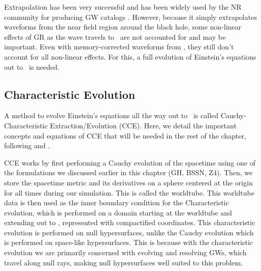 \begin{bibunit}[unsrtnat]
Extrapolation has been very successful and has been widely used by the NR
community for producing GW catalogs
\cite{Boyle:2019kee,Healy:2022wdn,Ferguson:2023vta,Hamilton:2023qkv}. However,
because it simply extrapolates waveforms from the near field region around the
black hole, some non-linear effects of GR as the wave travels to \scri~are not
accounted for and may be important. Even with memory-corrected waveforms from
\cite{Scheel:2025jct}, they still don't account for all non-linear effects. For
this, a full evolution of Einstein's equations out to \scri~is needed.

\subsection{Characteristic Evolution}

A method to evolve Einstein's equations all the way out to \scri~is called
Cauchy-Characteristic Extraction/Evolution (CCE). Here, we detail the important
concepts and equations of CCE that will be needed in the rest of the chapter,
following \cite{Moxon:2020gha} and \cite{Moxon:2021gbv}.

CCE works by first performing a Cauchy evolution of the spacetime using one of
the formulations we discussed earlier in this chapter (GH, BSSN, Z4). Then, we
store the spacetime metric and its derivatives on a sphere centered at the
origin for all times during our simulation. This is called the worldtube. This
worldtube data is then used as the inner boundary condition for the
Characteristic evolution, which is performed on a domain starting at the
worldtube and extending out to \scri, represented with compactified coordinates.
This characteristic evolution is performed on null hypersurfaces, unlike the
Cauchy evolution which is performed on space-like hypersurfaces. This is because
with the characteristic evolution we are primarily concerned with evolving and
resolving GWs, which travel along null rays, making null hypersurfaces well
suited to this problem.


\end{bibunit}
